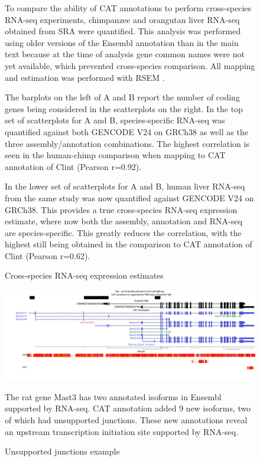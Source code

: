 \documentclass[fleqn,10pt]{wlscirep}
\begin{document}
\begin{figure}
\ContinuedFloat
\caption{Cross-species RNA-seq expression estimates}

To compare the ability of CAT annotations to perform cross-species RNA-seq experiments, chimpanzee and orangutan liver RNA-seq obtained from SRA \cite{brawand2011evolution} were quantified. This analysis was performed using older versions of the Ensembl annotation than in the main text because at the time of analysis gene common names were not yet available, which prevented cross-species comparison. All mapping and estimation was performed with RSEM \cite{li2011rsem}. 

The barplots on the left of A and B report the number of coding genes being considered in the scatterplots on the right. In the top set of scatterplots for A and B, species-specific RNA-seq was quantified against both GENCODE V24 on GRCh38 as well as the three assembly/annotation combinations. The highest correlation is seen in the human-chimp comparison when mapping to CAT annotation of Clint (Pearson r=0.92). 

In the lower set of scatterplots for A and B, human liver RNA-seq from the same study was now quantified against GENCODE V24 on GRCh38. This provides a true cross-species RNA-seq expression estimate, where now both the assembly, annotation and RNA-seq are species-specific. This greatly reduces the correlation, with the highest still being obtained in the comparison to CAT annotation of Clint (Pearson r=0.62).
\label{supp_fig:primate_expression}
\end{figure}

\begin{figure}
\centering
\includegraphics[width=\textwidth,height=\textheight,keepaspectratio,angle=90]{mast3_example.pdf}
\caption{Unsupported junctions example}
The rat gene Mast3 has two annotated isoforms in Ensembl supported by RNA-seq. CAT annotation added 9 new isoforms, two of which had unsupported junctions. These new annotations reveal an upstream transcription initiation site supported by RNA-seq. 
\label{supp_fig:unsupported_junctions}
\end{figure}
\end{document}
